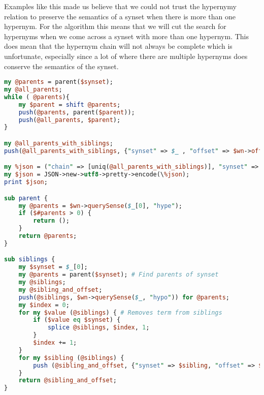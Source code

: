 Examples like this made us believe that we could not trust the hypernymy relation to preserve the semantics of a
synset when there is more than one hypernym.
For the algorithm this means that we will cut the search for hypernyms when we come across a synset with more than one hypernym.
This does mean that the hypernym chain will not always be complete which is unfortunate,
especially since a lot of where there are multiple hypernyms does conserve the semantics of the synset.



\begin{lstlisting}[language=perl, caption=experiment]
my @parents = parent($synset);
my @all_parents;
while ( @parents){
	my $parent = shift @parents;
	push(@parents, parent($parent));
	push(@all_parents, $parent);
}

my @all_parents_with_siblings;
push(@all_parents_with_siblings, {"synset" => $_ , "offset" => $wn->offset($_) ,"siblings" => [siblings($_)]}) for @all_parents;

my %json = ("chain" => [uniq(@all_parents_with_siblings)], "synset" => $synset, "offset"=> $wn->offset($synset), "siblings" => [siblings($synset)]);
my $json = JSON->new->utf8->pretty->encode(\%json);
print $json;

sub parent {
	my @parents = $wn->querySense($_[0], "hype");
	if ($#parents > 0) {
		return ();
	}
	return @parents;
}

sub siblings {
	my $synset = $_[0];
	my @parents = parent($synset); # Find parents of synset
	my @siblings;
	my @sibling_and_offset;
	push(@siblings, $wn->querySense($_, "hypo")) for @parents;
	my $index = 0;
	for my $value (@siblings) { # Removes term from siblings
		if ($value eq $synset) {
			splice @siblings, $index, 1;
		}
		$index += 1;
	}
	for my $sibling (@siblings) {
		push (@sibling_and_offset, {"synset" => $sibling, "offset" => $wn->offset($sibling)});
	}
	return @sibling_and_offset;
}
\end{lstlisting}

